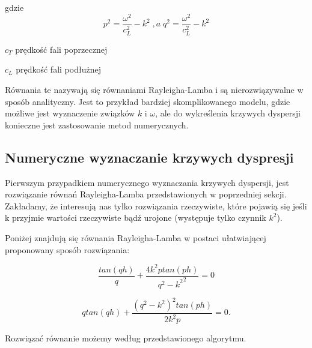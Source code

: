 gdzie
\begin{equation}
p^2=\frac{\omega^2}{c_L^2} - k^2 \; ,a \; q^2=\frac{\omega^2}{c_L^2}-k^2
\end{equation}

\begin{eqwhere}[2cm]
        \item[$c_T$] prędkość fali poprzecznej
	\item[$c_L$] prędkość fali podłużnej
\end{eqwhere}

Równania te nazywają się równaniami Rayleigha-Lamba i są nierozwiązywalne w sposób analityczny. Jest to przykład bardziej skomplikowanego modelu, gdzie możliwe jest wyznaczenie związków \(k\) i \(\omega\), ale do wykreślenia krzywych dyspersji konieczne jest zastosowanie metod numerycznych.

\subsection{Numeryczne wyznaczanie krzywych dyspresji}
Pierwszym przypadkiem numerycznego wyznaczania krzywych dyspersji, jest rozwiązanie równań Rayleigha-Lamba przedstawionych w poprzedniej sekcji. Zakładamy, że interesują nas tylko rozwiązania rzeczywiste, które pojawią się jeśli k przyjmie wartości rzeczywiste bądź urojone (występuje tylko czynnik \(k^2\)).

Poniżej znajdują się równania Rayleigha-Lamba w postaci ułatwiającej proponowany sposób rozwiązania:

\begin{equation}
\frac{tan(qh)}{q}+\frac{4k^2ptan(ph)}{{q^2-k^2}^2}=0
\end{equation}

\begin{equation}
qtan(qh)+\frac{{(q^2-k^2)}^2tan(ph)}{2k^2p}=0.
\end{equation}

\vspace{5mm}

Rozwiązać równanie możemy według przedstawionego algorytmu.

